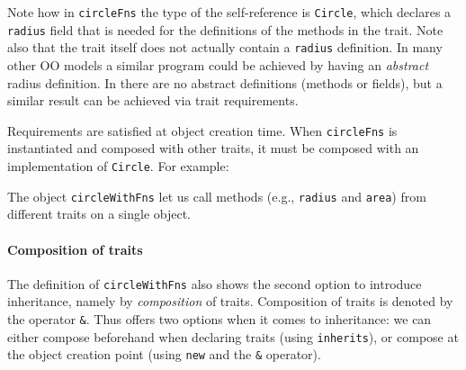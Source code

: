 \noindent Note how in \lstinline$circleFns$ the type of the self-reference is
\lstinline$Circle$, which declares a \lstinline{radius} field that is needed for
the definitions of the methods in the trait. Note also that the trait itself
does not actually contain a \lstinline{radius} definition. In many other OO
models a similar program could be achieved by having an \emph{abstract} radius
definition. In \name there are no abstract definitions (methods or fields), but
a similar result can be achieved via trait requirements.

Requirements are satisfied at object creation time. When \lstinline$circleFns$
is instantiated and composed with other traits, it must be composed with an
implementation of \lstinline$Circle$. For example:

\noindent The object \lstinline{circleWithFns} let us call methods (e.g.,
\lstinline{radius} and \lstinline{area}) from different traits on a single
object.

\paragraph{Composition of traits}
The definition of \lstinline{circleWithFns} also shows the second option to
introduce inheritance, namely by \textit{composition} of traits. Composition of
traits is denoted by the operator \lstinline{&}. Thus \name offers two options
when it comes to inheritance: we can either compose beforehand when declaring
traits (using \lstinline{inherits}), or compose at the object creation point
(using \lstinline{new} and the \lstinline{&} operator).

\begin{comment}
\paragraph{Mutually dependent traits} When two traits are composed, any two
methods in those two traits can refer to each other via the self-reference. We
say these two traits are \textit{mutually dependent}. The next example, though a
bit contrived, illustrates this point.

\noindent By utilizing trait requirements, the \lstinline{isEven} and
\lstinline{isOdd} methods can refer to each other in two different traits.
\end{comment}



